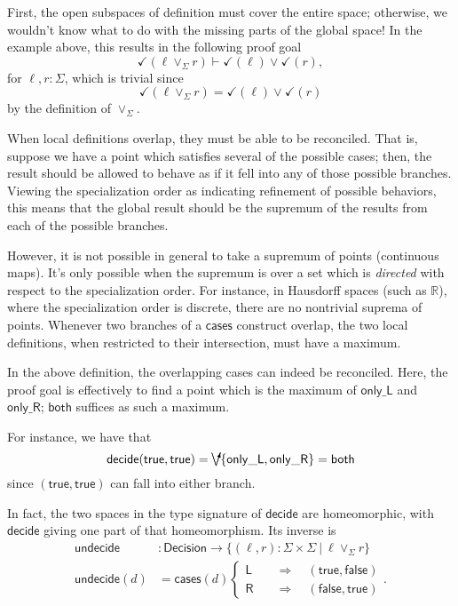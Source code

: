 \documentclass{article}           %
\newcommand{\R}{\mathbb{R}}
\newcommand{\suchthat}{\ |\ }
\newcommand{\dirsup}{\mathop{\setlength{\unitlength}{.7em}\raisebox{-.2em}%
    {\begin{picture}(1,1.5)\put(.5,0){\line(-1,3){.48}}
    \put(.5,0){\vector(1,3){.5}}\end{picture}}}}
\begin{document}
First, the open subspaces of definition must cover the entire space; otherwise, we wouldn't know what to do with the missing parts of the global space! In the example above, this results in the following proof goal
\[
\checkmark(\ell \vee_\Sigma r) \vdash \checkmark(\ell) \vee \checkmark(r),
\]
for $\ell, r : \Sigma$, which is trivial since
\[
\checkmark(\ell \vee_\Sigma r) = \checkmark(\ell) \vee \checkmark(r)
\]
by the definition of $\vee_\Sigma$.

When local definitions overlap, they must be able to be reconciled. That is, suppose we have a point which satisfies several of the possible cases; then, the result should be allowed to behave as if it fell into any of those possible branches. Viewing the specialization order as indicating refinement of possible behaviors, this means that the global result should be the supremum of the results from each of the possible branches.

However, it is not possible in general to take a supremum of points (continuous maps). It's only possible when the supremum is over a set which is \emph{directed} with respect to the specialization order. For instance, in Hausdorff spaces (such as $\R$), where the specialization order is discrete, there are no nontrivial suprema of points. Whenever two branches of a $\mathsf{cases}$ construct overlap, the two local definitions, when restricted to their intersection, must have a maximum.

In the above definition, the overlapping cases can indeed be reconciled. Here, the proof goal is effectively to find a point which is the maximum of $\mathsf{only\_L}$ and $\mathsf{only\_R}$; $\mathsf{both}$ suffices as such a maximum. 

For instance, we have that
\[
\mathsf{decide}(\mathsf{true}, \mathsf{true}) = \dirsup \{ \mathsf{only\_L} , \mathsf{only\_R} \} = \mathsf{both}
\]
since $(\mathsf{true}, \mathsf{true})$ can fall into either branch.


In fact, the two spaces in the type signature of $\mathsf{decide}$ are homeomorphic, with $\mathsf{decide}$ giving one part of that homeomorphism. Its inverse is
\begin{align*}
\mathsf{undecide} &: \mathsf{Decision} \to \{ (\ell, r) : \Sigma \times \Sigma \suchthat \ell \vee_\Sigma r \}
\\ \mathsf{undecide}(d) &= \mathsf{cases}(d)
\begin{cases}
\mathsf{L}
  \quad &\Longrightarrow \quad (\mathsf{true}, \mathsf{false})
\\
\mathsf{R}
  \quad &\Longrightarrow \quad (\mathsf{false}, \mathsf{true})
\end{cases}.
\end{align*}
\end{document}
